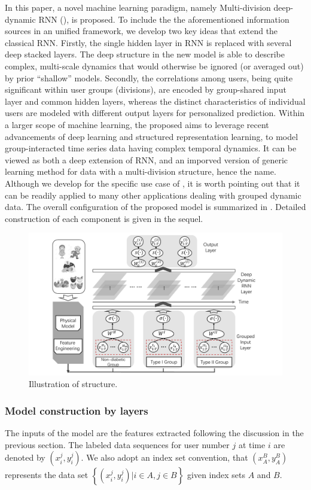 In this paper, a novel machine learning paradigm, namely Multi-division deep-dynamic RNN (\modelname), is proposed.
To include the the aforementioned information sources in an unified framework, we develop two key ideas that extend the classical RNN.
Firstly, the single hidden layer in RNN is replaced with several deep stacked layers.
The deep structure in the new model is able to describe complex, multi-scale dynamics that would otherwise be ignored (or averaged out) by prior ``shallow'' models.
Secondly, the correlations among users, being quite significant within user groups (divisions), are encoded by group-shared input layer and common hidden layers, whereas the distinct characteristics of individual users are modeled with different output layers for personalized prediction.
Within a larger scope of machine learning, the proposed \modelname aims to leverage recent advancements of deep learning and structured representation learning, to model group-interacted time series data having complex temporal dynamics.
It can be viewed as both a deep extension of RNN, and an imporved version of generic learning method for data with a multi-division structure, hence the name.
Although we develop \modelname for the specific use case of \sysname, it is worth pointing out that it can be readily applied to many other applications dealing with grouped dynamic data.
The overall configuration of the proposed model is summarized in .
Detailed construction of each component is given in the sequel.

\begin{figure}[h]
  \centering
  \includegraphics[width=0.75\columnwidth]{./img/pics_RNN3.pdf}
  \caption{Illustration of \modelname structure.}
  \label{fig:rnn}
\end{figure}

\subsubsection{Model construction by layers}
The inputs of the \modelname model are the features extracted following the discussion in the previous section.
The labeled data sequences for user number $j$ at time $i$ are denoted by $(x_i^{j},y_i^{j})$.
We also adopt an index set convention, that $(x_A^{B},y_A^B)$ represents the data set $\left\{(x_i^{j},y_i^{j}) | i \in A, j\in B\right\}$ given index sets $A$ and $B$.

